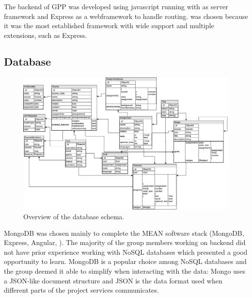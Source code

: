
The backend of GPP was developed using javascript running with \nodejs{} as server framework and Express as a webframework to handle routing. \nodejs{} was chosen because it was the most established framework with wide support and multiple extensions, such as Express.

\subsection{Database} \label{database}


\begin{figure}
    \centering
    \includegraphics[width=\textwidth]{img/gpp_database-schema.pdf}
    \caption{Overview of the database schema.}
    \label{fig:schema}
\end{figure}

MongoDB was chosen mainly to complete the MEAN software stack (MongoDB, Express, Angular, \nodejs{}). The majority of the group members working on backend did not have prior experience working with NoSQL databases which presented a good opportunity to learn. MongoDB is a popular choice among NoSQL databases and the group deemed it able to simplify when interacting with the data: Mongo uses a JSON-like document structure and JSON is the data format used when different parts of the project services communicates.

